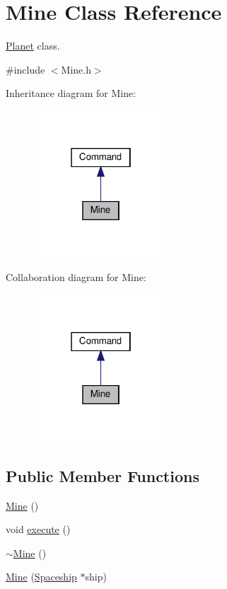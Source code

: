 \hypertarget{classMine}{}\section{Mine Class Reference}
\label{classMine}


\hyperlink{classPlanet}{Planet} class.  




{\ttfamily \#include $<$Mine.\+h$>$}



Inheritance diagram for Mine\+:\nopagebreak
\begin{figure}[H]
\begin{center}
\leavevmode
\includegraphics[width=142pt]{classMine__inherit__graph}
\end{center}
\end{figure}


Collaboration diagram for Mine\+:\nopagebreak
\begin{figure}[H]
\begin{center}
\leavevmode
\includegraphics[width=142pt]{classMine__coll__graph}
\end{center}
\end{figure}
\subsection*{Public Member Functions}
\begin{DoxyCompactItemize}
\item 
\hyperlink{classMine_a84f100c1d6797402ab2220d2ad699be2}{Mine} ()
\item 
void \hyperlink{classMine_a2cfa55d098ec47369eed81226d82da25}{execute} ()
\item 
\hyperlink{classMine_abfde171f93b463d81d5b18f767a3a37c}{$\sim$\+Mine} ()
\item 
\hyperlink{classMine_a3a7383f5c2f0f98b7d2c0cb2a9a67073}{Mine} (\hyperlink{classSpaceship}{Spaceship} $\ast$ship)
\end{DoxyCompactItemize}


